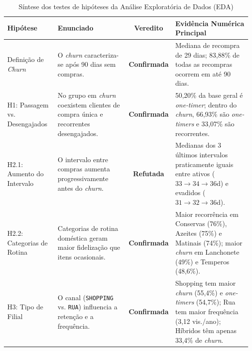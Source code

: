 \begin{table}[H]
\centering
\caption{Síntese dos testes de hipóteses da Análise Exploratória de Dados (EDA)}
\label{tab:sintese_hipoteses_eda}
\footnotesize
\begin{tabular}{p{2.8cm}p{4.5cm}cp{6.2cm}}
\toprule
\textbf{Hipótese} & \textbf{Enunciado} & \textbf{Veredito} & \textbf{Evidência Numérica Principal} \\
\midrule
Definição de \textit{Churn} & O \textit{churn} caracteriza-se após 90 dias sem compras. & \textbf{Confirmada} & Mediana de recompra de 29 dias; 83,88\% de todas as recompras ocorrem em até 90 dias. \\
\addlinespace
H1: Passagem vs. Desengajados & No grupo em \textit{churn} coexistem clientes de compra única e recorrentes desengajados. & \textbf{Confirmada} & 50,20\% da base geral é \textit{one-timer}; dentro do \textit{churn}, 66,93\% são \textit{one-timers} e 33,07\% são recorrentes. \\
\addlinespace
H2.1: Aumento do Intervalo & O intervalo entre compras aumenta progressivamente antes do \textit{churn}. & \textbf{Refutada} & Medianas dos 3 últimos intervalos praticamente iguais entre ativos ($33 \rightarrow 34 \rightarrow 36$d) e evadidos ($31 \rightarrow 32 \rightarrow 36$d). \\
\addlinespace
H2.2: Categorias de Rotina & Categorias de rotina doméstica geram maior fidelização que itens ocasionais. & \textbf{Confirmada} & Maior recorrência em Conservas (76\%), Azeites (75\%) e Matinais (74\%); maior \textit{churn} em Lanchonete (49\%) e Temperos (48,6\%). \\
\addlinespace
H3: Tipo de Filial & O canal (\texttt{SHOPPING} vs. \texttt{RUA}) influencia a retenção e a frequência. & \textbf{Confirmada} & Shopping tem maior \textit{churn} (55,4\%) e \textit{one-timers} (54,7\%); Rua tem maior frequência (3,12 vis./ano); Híbridos têm apenas 33,4\% de \textit{churn}. \\
\bottomrule
\end{tabular}
\end{table}